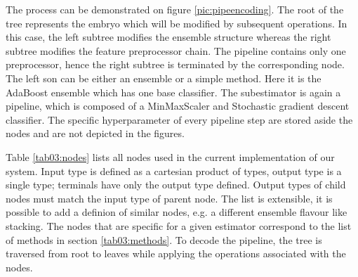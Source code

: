 The process can be demonstrated on figure
\ref{pic:pipeencoding}. The root of the tree represents the embryo which will
be modified by subsequent operations. In this case, the left subtree modifies
the ensemble structure whereas the right subtree modifies the feature
preprocessor chain. The pipeline contains only one preprocessor, hence the
right subtree is terminated by the corresponding node. The left son can be
either an ensemble or a simple method. Here it is the AdaBoost ensemble which
has one base classifier. The subestimator is again a pipeline, which is composed
of a MinMaxScaler and Stochastic gradient descent classifier. The specific
hyperparameter of every pipeline step are stored aside the nodes and are not
depicted in the figures.

\label{sec:decoding}
Table \ref{tab03:nodes} lists all nodes used in the current implementation of
our system. Input type is defined as a cartesian product of types, output type
is a single type; terminals have only the output type defined. Output types of
child nodes must match the input type of parent node. The list is extensible,
it is possible to add a definion of similar nodes, e.g. a different ensemble
flavour like stacking. The nodes that are specific for a given estimator
correspond to the list of methods in section \ref{tab03:methods}. To decode
the pipeline, the tree is traversed from root to leaves while applying the
operations associated with the nodes.

